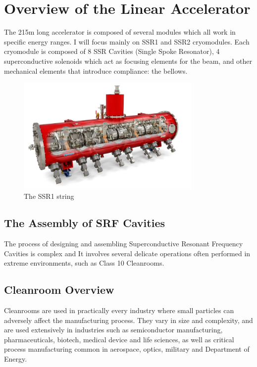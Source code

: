\documentclass[12pt,a4paper]{article}
\begin{document}
\section{Overview of the Linear Accelerator}
The 215m long accelerator is composed of several modules which all work in specific energy ranges. \newline
I will focus mainly on SSR1 and SSR2 cryomodules. Each cryomodule is composed of 8 SSR Cavities (Single Spoke Resonator), 4 superconductive solenoids which act as focusing elements for the beam, and other mechanical elements that introduce compliance: the bellows.

\begin{figure}[h!]
\centering
\includegraphics[width=0.8\textwidth]{23.png}
\caption{The SSR1 string}
\end{figure}

\subsection{The Assembly of SRF Cavities}
The process of designing and assembling Superconductive Resonant Frequency Cavities is complex and It involves several delicate operations often performed in extreme environments, such as Class 10 Cleanrooms.

\clearpage
\newpage

\subsection{Cleanroom Overview}



Cleanrooms are used in practically every industry where small particles can adversely affect the manufacturing process. They vary in size and complexity, and are used extensively in industries such as semiconductor manufacturing, pharmaceuticals, biotech, medical device and life sciences, as well as critical process manufacturing common in aerospace, optics, military and Department of Energy.
\end{document}
